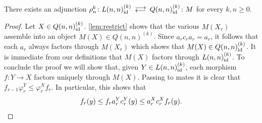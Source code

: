 \documentclass[a4paper,reqno,twoside]{amsart}
\begin{document}
\begin{proposition}\label{prop:Lcoreflect}
	There exists an adjunction $\rho^k_n \colon L(n,n)_{\id}^{(k)} \llra Q(n,n)_{\id}^{(k)} \colon M$ for every $k,n \geq 0$.
\end{proposition}
\begin{proof}
	Let $X \in Q(n,n)_{\mathrm{id}}^{(k)}$. \cref{lem:restrict} shows that the various $M(X_r)$ assemble into an object $M(X)\in Q(n,n)^{(k)}$. Since $a_{r}c_ra_r=a_r$, it follows that each $a_r$ always factors through $M(X_r)$ which shows that $M(X)\in Q(n,n)^{(k)}_{\mathrm{id}}$. It is immediate from our definitions that $M(X)$ factors through $L(n,n)^{(k)}_{\mathrm{id}}$. To conclude the proof we will show that, given $Y \in L(n,n)_{\mathrm{id}}^{(k)}$, each morphism $f \colon Y \to X$ factors uniquely through $M(X)$. Passing to mates it is clear that $f_{r-1} \varphi_{r}^Y \leq \varphi_r^X f_r$. In particular, this shows that
	\[
		f_r(y) \leq f_r a_r^{Y}c_r^{Y}(y) \leq a_r^{X}c_r^{X}f_r(y). \qedhere
	\]
	
\end{proof}
\end{document}
